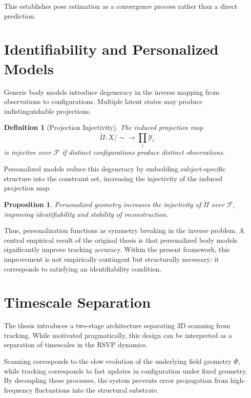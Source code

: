 \documentclass[12pt]{article}
\newtheorem{definition}{Definition}
\newtheorem{proposition}{Proposition}
\begin{document}
This establishes pose estimation as a convergence process rather than a direct prediction.

\section{Identifiability and Personalized Models}

Generic body models introduce degeneracy in the inverse mapping from observations to configurations. Multiple latent states may produce indistinguishable projections.

\begin{definition}[Projection Injectivity]
The induced projection map
\[
\tilde{\Pi} : X/{\sim} \to \prod_i \mathcal{Y}_i
\]
is injective over $\mathcal{F}$ if distinct configurations produce distinct observations.
\end{definition}

Personalized models reduce this degeneracy by embedding subject-specific structure into the constraint set, increasing the injectivity of the induced projection map.

\begin{proposition}
Personalized geometry increases the injectivity of $\tilde{\Pi}$ over $\mathcal{F}$, improving identifiability and stability of reconstruction.
\end{proposition}

Thus, personalization functions as symmetry breaking in the inverse problem. A central empirical result of the original thesis is that personalized body models significantly improve tracking accuracy. Within the present framework, this improvement is not empirically contingent but structurally necessary: it corresponds to satisfying an identifiability condition.

\section{Timescale Separation}

The thesis introduces a two-stage architecture separating 3D scanning from tracking. While motivated pragmatically, this design can be interpreted as a separation of timescales in the RSVP dynamics.

Scanning corresponds to the slow evolution of the underlying field geometry $\Phi$, while tracking corresponds to fast updates in configuration under fixed geometry. By decoupling these processes, the system prevents error propagation from high-frequency fluctuations into the structural substrate.
\end{document}
